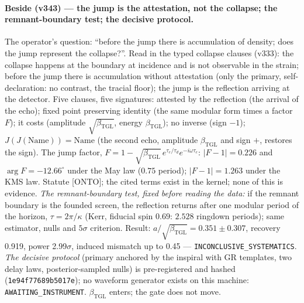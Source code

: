 \documentclass[11pt]{article}
\newcommand{\bTGL}{\beta_{\mathrm{TGL}}}\newcommand{\Msun}{M_{\odot}}\newcommand{\TGL}{\mathrm{TGL}}
\theoremstyle{definition}\newtheorem{deriv}{Derivation}
\begin{document}
\paragraph*{Beside (v343) --- the jump is the attestation, not the collapse; the remnant-boundary test; the decisive protocol.} The operator's question: ``before the jump there is accumulation of density; does the jump represent the collapse?''. Read in the typed collapse clauses (v333): the collapse happens at the boundary at incidence and is not observable in the strain; before the jump there is accumulation without attestation (only the primary, self-declaration: no contrast, the tracial floor); the jump is the reflection arriving at the detector. Five clauses, five signatures: attested by the reflection (the arrival of the echo); fixed point preserving identity (the same modular form times a factor $F$); it costs (amplitude $\sqrt{\bTGL}$, energy $\bTGL$); no inverse (sign $-1$); $J(J(\mathrm{Name}))=\mathrm{Name}$ (the second echo, amplitude $\bTGL$ and sign $+$, restores the sign). The jump factor, $F=1-\sqrt{\bTGL}\,e^{\tau_e/\tau_d}e^{-i\omega\tau_e}$: $|F-1|=0.226$ and $\arg F=-12.66^\circ$ under the May law ($0.75$ period); $|F-1|=1.263$ under the KMS law. Statute [ONTO]; the cited terms exist in the kernel; none of this is evidence. \emph{The remnant-boundary test, fixed before reading the data:} if the remnant boundary is the founded screen, the reflection returns after one modular period of the horizon, $\tau=2\pi/\kappa$ (Kerr, fiducial spin $0.69$: $2.528$ ringdown periods); same estimator, nulls and $5\sigma$ criterion. Result: $a/\sqrt{\bTGL}=0.351\pm0.307$, recovery 0.919, power 2.99$\sigma$, induced mismatch up to 0.45 --- \texttt{INCONCLUSIVE\_SYSTEMATICS}. \emph{The decisive protocol} (primary anchored by the inspiral with GR templates, two delay laws, posterior-sampled nulls) is pre-registered and hashed (\texttt{1e94f77689b5017e}); no waveform generator exists on this machine: \texttt{AWAITING\_INSTRUMENT}. $\bTGL$ enters; the gate does not move.
\end{document}

